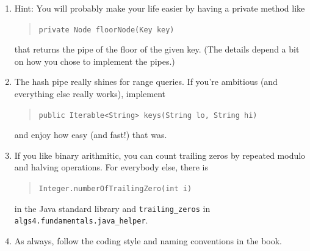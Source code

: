 \documentclass{tufte-handout}
\begin{document}
\begin{enumerate}
  \item Hint: You will probably make your life easier by having  a private method like \begin{quote}
    \tt private Node floorNode(Key key)
    \end{quote}
    that returns the pipe of the floor of the given key.
      (The details depend a bit on how you chose to implement the pipes.)


    \item The hash pipe really shines for range queries.
      If you're ambitious (and everything else really works), implement 
      \begin{quote}
	\tt public Iterable<String> keys(String lo, String hi)
      \end{quote}
      and enjoy how easy (and fast!) that was.

    \item If you like binary arithmitic, you can count trailing zeros by repeated modulo and halving operations.
      For everybody else, there is 
    \begin{quote}
    \tt Integer.numberOfTrailingZero(int i)
  \end{quote}
  in the Java standard library and \texttt{trailing\_zeros} in \texttt{algs4.fundamentals.java\_helper}.

    \item As always, follow the coding style and naming conventions in the book.

\end{enumerate}
\end{document}
